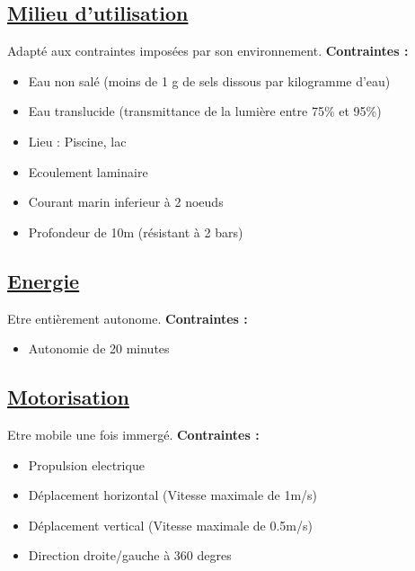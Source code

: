 \documentclass[a4paper,11pt]{report}
\begin{document}
						\subsection*{\underline{Milieu d'utilisation}}
								Adapté aux contraintes imposées par son environnement. \newline
								\textbf{Contraintes :}
								\begin{itemize}
										\item Eau non salé (moins de 1 g de sels dissous par kilogramme d'eau)
										\item Eau translucide (transmittance de la lumière entre 75\% et 95\%)
										\item Lieu : Piscine, lac
										\item Ecoulement laminaire
										\item Courant marin inferieur à 2 noeuds
										\item Profondeur de 10m (résistant à 2 bars) \newline
								\end{itemize}

						\subsection*{\underline{Energie}}
								Etre entièrement autonome. \newline
								\textbf{Contraintes :}
								\begin{itemize}
										\item Autonomie de 20 minutes \newline
								\end{itemize}

						\subsection*{\underline{Motorisation}}
								Etre mobile une fois immergé. \newline
								\textbf{Contraintes :}
								\begin{itemize}
										\item Propulsion electrique
										\item Déplacement horizontal (Vitesse maximale de 1m/s)
										\item Déplacement vertical (Vitesse maximale de 0.5m/s)
										\item Direction droite/gauche à 360 degres   \newline
								\end{itemize}
\end{document}
